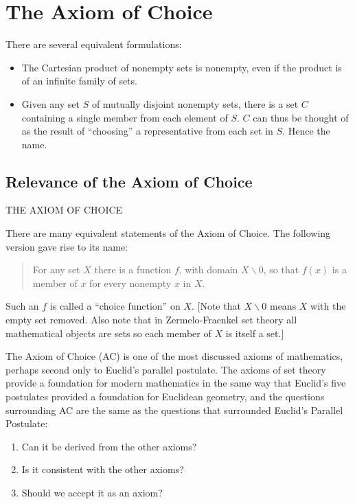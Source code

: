 \section{The Axiom of Choice}

There are several equivalent formulations:

\begin{itemize}

  \item The Cartesian product of nonempty sets is nonempty, even if the
  product is of an infinite family of sets.

  \item Given any set $S$ of mutually disjoint nonempty sets, there is a
  set $C$ containing a single member from each element of $S$.  $C$ can
  thus be thought of as the result of ``choosing'' a representative from
  each set in $S$. Hence the name.
\end{itemize}

\subsection{Relevance of the Axiom of Choice}
THE AXIOM OF CHOICE

There are many equivalent statements of the Axiom of Choice.  The
following version gave rise to its name:
\begin{quote}
  For any set $X$ there is a function $f$, with domain $X\backslash{0}$,
  so that $f(x)$ is a member of $x$ for every nonempty $x$ in $X$.
\end{quote}

Such an $f$ is called a ``choice function'' on $X$.  [Note that
$X\backslash {0}$ means $X$ with the empty set removed.  Also note that
in Zermelo-Fraenkel set theory all mathematical objects are sets so each
member of $X$ is itself a set.]

The Axiom of Choice (AC) is one of the most discussed axioms of
mathematics, perhaps second only to Euclid's parallel postulate.  The
axioms of set theory provide a foundation for modern mathematics in the
same way that Euclid's five postulates provided a foundation for
Euclidean geometry, and the questions surrounding AC are the same as the
questions that surrounded Euclid's Parallel Postulate:

\begin{enumerate}
  \item Can it be derived from the other axioms?
  \item Is it consistent with the other axioms?
  \item Should we accept it as an axiom?
\end{enumerate}


